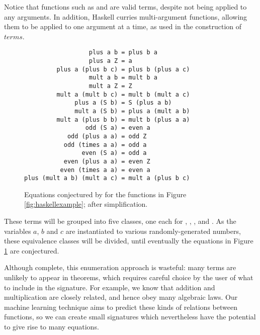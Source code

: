 Notice that functions such as  and  are valid terms, despite not being applied to any arguments. In addition, Haskell curries multi-argument functions, allowing them to be applied to one argument at a time, as used in the construction of $terms$.

\begin{figure}
  \begin{verbatim}
                  plus a b = plus b a
                  plus a Z = a
         plus a (plus b c) = plus b (plus a c)
                  mult a b = mult b a
                  mult a Z = Z
         mult a (mult b c) = mult b (mult a c)
              plus a (S b) = S (plus a b)
              mult a (S b) = plus a (mult a b)
         mult a (plus b b) = mult b (plus a a)
                 odd (S a) = even a
            odd (plus a a) = odd Z
           odd (times a a) = odd a
                even (S a) = odd a
           even (plus a a) = even Z
          even (times a a) = even a
plus (mult a b) (mult a c) = mult a (plus b c)
  \end{verbatim}
  \caption{Equations conjectured by \qspec{} for the functions in Figure \ref{fig:haskellexample}; after simplification.}
  \label{fig:qspecresult}
\end{figure}

These terms will be grouped into five classes, one each for , , ,  and . As the variables $a$, $b$ and $c$ are instantiated to various randomly-generated numbers, these equivalence classes will be divided, until eventually the equations in Figure \ref{fig:qspecresult} are conjectured.
\fi

Although complete, this enumeration approach is wasteful: many terms are unlikely to appear in theorems, which requires careful choice by the user of what to include in the signature. For example, we know that addition and multiplication are closely related, and hence obey many algebraic laws. Our machine learning technique aims to predict these kinds of relations between functions, so we can create small signatures which nevertheless have the potential to give rise to many equations.

\iffalse
TODO
In fact, there are similarities between the way a TE system like \qspec{} can generalise from checking \emph{particular} properties to \emph{inventing} new ones, and the way counterexample finders like \qcheck{} can generalise from testing \emph{particular} expressions to \emph{inventing} expressions to test. One of our aims is to understand the implications of this generalisation, the lessons that each can learn from the other's approach to term generation, and the consequences for testing and QA in general.
\fi

